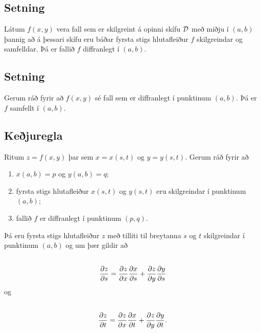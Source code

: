\documentclass[a4paper,10pt,icelandic]{sphinxmanual}
\begin{document}
\subsection{Setning}
\label{Kafli2:id32}
Látum \(f(x,y)\) vera fall sem er skilgreint á opinni skífu
\(\cal D\) með miðju í \((a,b)\) þannig að á þessari skífu eru
báðar fyrsta stigs hlutafleiður \(f\) skilgreindar og samfelldar. Þá
er fallið \(f\) diffranlegt í \((a,b)\).


\subsection{Setning}
\label{Kafli2:id33}
Gerum ráð fyrir að \(f(x,y)\) sé fall sem er diffranlegt í punktinum
\((a,b)\). Þá er \(f\) samfellt í \((a,b)\).


\subsection{Keðjuregla}
\label{Kafli2:id34}
Ritum \(z=f(x,y)\) þar sem \(x=x(s,t)\) og \(y=y(s,t)\).
Gerum ráð fyrir að
\begin{enumerate}
\item {} 
\(x(a,b)=p\) og \(y(a,b)=q\);

\item {} 
fyrsta stigs hlutafleiður \(x(s,t)\) og \(y(s,t)\) eru
skilgreindar í punktinum \((a,b)\);

\item {} 
fallið \(f\) er diffranlegt í punktinum \((p,q)\).

\end{enumerate}

Þá eru fyrsta stigs hlutafleiður \(z\) með tilliti til breytanna
\(s\) og \(t\) skilgreindar í punktinum \((a,b)\) og um þær
gildir að
\begin{gather}
\begin{split}\displaystyle\end{split}\notag\\\begin{split}\frac{\partial z}{\partial s}=
\frac{\partial z}{\partial x}\frac{\partial x}{\partial s}
+\frac{\partial z}{\partial y}\frac{\partial y}{\partial s}\end{split}\notag
\end{gather}
og
\begin{gather}
\begin{split}\displaystyle\end{split}\notag\\\begin{split}\frac{\partial z}{\partial t}=
\frac{\partial z}{\partial x}\frac{\partial x}{\partial t}
+\frac{\partial z}{\partial y}\frac{\partial y}{\partial t}.\end{split}\notag
\end{gather}
\end{document}
